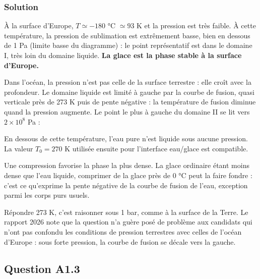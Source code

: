 \documentclass[11pt,a4paper]{article}
\newcommand{\equationajustee}[1]{%
  \sbox{\boiteequation}{$\displaystyle #1$}%
  \ifdim\wd\boiteequation>\linewidth
    \[\resizebox{\linewidth}{!}{\usebox{\boiteequation}}\]%
  \else
    \[#1\]%
  \fi}
\begin{document}
\hypertarget{solution-1}{%
\subsubsection{Solution}\label{solution-1}}

À la surface d'Europe, \(T \simeq -180\) °C \(\simeq 93\) K et la pression est très faible. À cette température, la pression de sublimation est extrêmement basse, bien en dessous de 1 Pa (limite basse du diagramme) : le point représentatif est dans le domaine I, très loin du domaine liquide. \textbf{La glace est la phase stable à la surface d'Europe.}

Dans l'océan, la pression n'est pas celle de la surface terrestre : elle croît avec la profondeur. Le domaine liquide est limité à gauche par la courbe de fusion, quasi verticale près de 273 K puis de pente négative : la température de fusion diminue quand la pression augmente. Le point le plus à gauche du domaine II se lit vers \(2\times10^8\) Pa :

\equationajustee{\boxed{T_{min} \simeq 250\ \mathrm{K}\ (\approx -20\ ^\circ\mathrm{C}),\ \text{sous environ } 2\times10^{8}\ \mathrm{Pa}}}

En dessous de cette température, l'eau pure n'est liquide sous aucune pression. La valeur \(T_0 = 270\) K utilisée ensuite pour l'interface eau/glace est compatible.

\begin{methode}

Une compression favorise la phase la plus dense. La glace ordinaire étant moins dense que l'eau liquide, comprimer de la glace près de 0 °C peut la faire fondre : c'est ce qu'exprime la pente négative de la courbe de fusion de l'eau, exception parmi les corps purs usuels.

\end{methode}

\begin{piege}

Répondre 273 K, c'est raisonner sous 1 bar, comme à la surface de la Terre. Le rapport 2026 note que la question n'a guère posé de problème aux candidats qui n'ont pas confondu les conditions de pression terrestres avec celles de l'océan d'Europe : sous forte pression, la courbe de fusion se décale vers la gauche.

\end{piege}

\hypertarget{question-a1.3}{%
\subsection{Question A1.3}\label{question-a1.3}}
\end{document}
